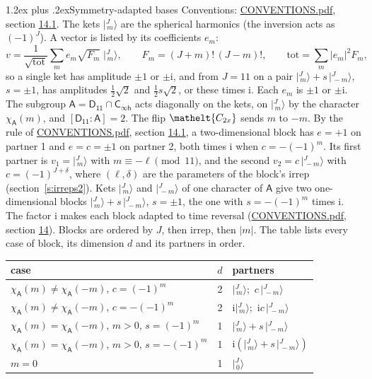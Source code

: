 \documentclass[10pt,a4paper]{article}
\makeatletter
\renewcommand\section{\@startsection{section}{1}{\z@}{-3ex plus -1ex minus -.2ex}%
  {1.2ex plus .2ex}{\normalfont\large\sffamily\bfseries\color{parttitle}}}
\numberwithin{equation}{section}
\newcommand{\eltfont}[1]{{\let\sigma\eltsigma\mathelt{#1}}}
\newcommand{\grp}[1]{\mathsf{#1}}
\newcommand{\elt}[1]{\eltfont{#1}}
\newcommand{\grpindex}[2]{[#1 : #2]}
\newcommand{\iunit}{\mathrm{i}}
\newcommand{\chiA}{\chi_{\grp{A}}}
\newcommand{\jm}[2]{\bigl\lvert{}^{#1}_{\,#2}\bigr\rangle}
\makeatother
\begin{document}
\section{Symmetry-adapted bases}\label{s:bases}
Conventions: \href{../../CONVENTIONS.pdf}{CONVENTIONS.pdf}, section \href{../../CONVENTIONS.pdf\#conv.14.1}{14.1}.
\leavevmode\label{n:index.m}\label{n:vector.ket}The kets $\jm{J}{m}$ are the spherical harmonics (the inversion acts as $(-1)^J$). \label{n:index.ketcoefficient}\label{n:vector.basis.symmetry}\label{n:index.ketweight}\label{n:index.total}A vector is listed by its coefficients $e_m$:
\begin{equation}\label{e:ket}v = \frac{1}{\sqrt{\mathrm{tot}}}\sum_m e_m\sqrt{F_m}\;\jm{J}{m},\qquad F_m = (J+m)!\,(J-m)!,\qquad \mathrm{tot} = \sum_m |e_m|^2F_m,\end{equation}
\leavevmode\label{n:index.pair.sign}so a single ket has amplitude $\pm1$ or $\pm\iunit$, and from $J = 11$ on a pair $\jm{J}{m} + s\,\jm{J}{-m}$, $s = \pm1$, has amplitudes $\tfrac{1}{2}\sqrt{2}$ and $\tfrac{1}{2}s\sqrt{2}$, or these times $\iunit$. Each $e_m$ is $\pm1$ or $\pm\iunit$.
\leavevmode\label{n:group.A}\label{n:function.character.abelian}The subgroup $\grp{A} = \grp{D_{11}}\cap\grp{C_{\infty h}}$ acts diagonally on the kets, on $\jm{J}{m}$ by the character $\chiA(m)$, and $\grpindex{\grp{D_{11}}}{\grp{A}} = 2$. The flip $\elt{C_{2x}}$ sends $m$ to $-m$. \label{n:index.partner.sign}By the rule of \href{../../CONVENTIONS.pdf}{CONVENTIONS.pdf}, section \href{../../CONVENTIONS.pdf\#conv.14.1}{14.1}, a two-dimensional block has $e = +1$ on partner 1 and $e = c = \pm1$ on partner 2, both times $\iunit$ when $c = -(-1)^m$. Its first partner is $v_1 = \jm{J}{m}$ with $m \equiv -\ell \pmod{11}$, and the second $v_2 = c\,\jm{J}{-m}$ with $c = (-1)^{J+\delta}$, where $(\ell, \delta)$ are the parameters of the block's irrep (section~\ref{s:irreps2}). Kets $\jm{J}{m}$ and $\jm{J}{-m}$ of one character of $\grp{A}$ give two one-dimensional blocks $\jm{J}{m} + s\,\jm{J}{-m}$, $s = \pm1$, the one with $s = -(-1)^m$ times $\iunit$. The factor $\iunit$ makes each block adapted to time reversal (\href{../../CONVENTIONS.pdf}{CONVENTIONS.pdf}, section \href{../../CONVENTIONS.pdf\#conv.14}{14}). Blocks are ordered by $J$, then irrep, then $|m|$.
\leavevmode\label{n:head.case}\label{n:head.partners}The table lists every case of block, its dimension $d$ and its partners in order.
\begin{center}\begin{tabular}{@{}lrl@{}}\toprule
case & $d$ & partners\\\midrule
$\chiA(m) \ne \chiA(-m)$, $c = (-1)^m$ & 2 & $\jm{J}{m}$;\ $c\,\jm{J}{-m}$\\
$\chiA(m) \ne \chiA(-m)$, $c = -(-1)^m$ & 2 & $\iunit\jm{J}{m}$;\ $\iunit c\,\jm{J}{-m}$\\
$\chiA(m) = \chiA(-m)$, $m > 0$, $s = (-1)^m$ & 1 & $\jm{J}{m} + s\,\jm{J}{-m}$\\
$\chiA(m) = \chiA(-m)$, $m > 0$, $s = -(-1)^m$ & 1 & $\iunit(\jm{J}{m} + s\,\jm{J}{-m})$\\
$m = 0$ & 1 & $\jm{J}{0}$\\
\bottomrule\end{tabular}\end{center}
\end{document}
